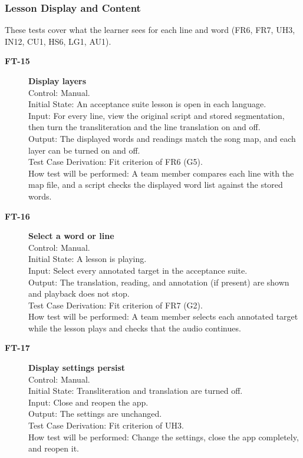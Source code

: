 \documentclass[12pt, titlepage]{article}
\newcommand{\tid}[1]{\hypertarget{test:#1}{\textbf{#1}}}
\begin{document}
\subsubsection{Lesson Display and Content} \label{SecDisplayTests}

These tests cover what the learner sees for each line and word (FR6, FR7, UH3,
IN12, CU1, HS6, LG1, AU1).

\begin{description}

\item[\tid{FT-15}] \textbf{Display layers}\\
Control: Manual.\\
Initial State: An acceptance suite lesson is open in each language.\\
Input: For every line, view the original script and stored segmentation, then
turn the transliteration and the line translation on and off.\\
Output: The displayed words and readings match the song map, and each layer can
be turned on and off.\\
Test Case Derivation: Fit criterion of FR6 (G5).\\
How test will be performed: A team member compares each line with the map
file, and a script checks the displayed word list against the stored words.

\item[\tid{FT-16}] \textbf{Select a word or line}\\
Control: Manual.\\
Initial State: A lesson is playing.\\
Input: Select every annotated target in the acceptance suite.\\
Output: The translation, reading, and annotation (if present) are shown and
playback does not stop.\\
Test Case Derivation: Fit criterion of FR7 (G2).\\
How test will be performed: A team member selects each annotated target while
the lesson plays and checks that the audio continues.

\item[\tid{FT-17}] \textbf{Display settings persist}\\
Control: Manual.\\
Initial State: Transliteration and translation are turned off.\\
Input: Close and reopen the app.\\
Output: The settings are unchanged.\\
Test Case Derivation: Fit criterion of UH3.\\
How test will be performed: Change the settings, close the app completely, and
reopen it.


\end{description}
\end{document}
